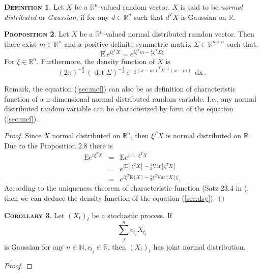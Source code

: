 \documentclass[a4paper, twoside, 11pt]{article}
\theoremstyle{definition}
\newtheorem{definition}{\scshape Definition}[section]
\newtheorem{proposition}[definition]{\scshape Proposition}
\newtheorem{corollary}[definition]{\scshape Corollary}
\newcommand{\sqbr}[1]{\left[ {#1} \right]}
\begin{document}
\begin{definition}
  Let $X$ be a $\mathbb{R}^{n}$-valued random vector. $X$ is said to be \emph{normal distributed} or \emph{Gaussian}, if for any $d \in \mathbb{R}^{n}$ such that $d^TX$ is Gaussian on $\mathbb{R}$.
\end{definition}
\begin{proposition}
  Let $X$ be a $\mathbb{R}^{n}$-valued normal distributed ramdon vector. Then there exist $m \in \mathbb{R}^{n}$ and a positive definite symmetric matrix $\Sigma \in \mathbb{R}^{n\times n}$ such that,
  \begin{equation}
	\mathrm{E}\,e^{i\xi^TX} = e^{i\xi^Tm - \frac{1}{2}\xi^T \Sigma \xi}
	\label{sec:mcf}
  \end{equation}
  For $\xi \in \mathbb{R}^{n}$. Furthermore, the density function of $X$ is
\begin{equation}
  (2\pi)^{-\frac{d}{2}}\, (\det\Sigma) ^{-\frac{1}{2}}\,e^{-\frac{1}{2}(x-m)^T\Sigma^{-1}(x-m)}\,\mathop{dx}.
  \label{sec:dsy}
\end{equation}
\end{proposition}

Remark, the equation (\ref{sec:mcf}) can also be as definition of characteristic function of a n-dimensional normal distributed random variable. I.e., any normal distributed random variable can be characterized by form of the equation (\ref{sec:mcf}).

\begin{proof}
  Since $X$ normal distributed on $\mathbb{R}^{n}$, then $\xi^T X$ is normal distributed on $\mathbb{R}$. Due to the Proposition 2.8 there is
  \begin{eqnarray*}
	\mathrm{E} e^{i\xi^T X} &=& \mathrm{E} e^{i\cdot 1 \cdot \xi^T X}\\
	                        &=& e^{i\mathrm{E}\sqbr{\xi^T X} -\frac{1}{2}\mathrm{Var}\sqbr{\xi^T X}}\\
							&=& e^{i\xi^T\mathrm{E}\sqbr{X} - \frac{1}{2}\xi^T \mathrm{Var}\sqbr{X} \xi}.
  \end{eqnarray*}
  According to the uniqueness theorem of characteristic function (Satz 23.4 in \cite{bauer}), then we can deduce the density function of the equation (\ref{sec:dsy}).
\end{proof}

\begin{corollary}
  Let $(X_t)_t$ be a stochastic process. If 
  \begin{equation}
	\sum_j^n c_{t_j} X_{t_j}
  \end{equation}
  is Gaussian for any $n \in \mathbb{N}, c_{t_j} \in \mathbb{R}$, then $(X_t)_t$ has joint normal distribution.
\end{corollary}
\begin{proof}
  
\end{proof}
\end{document}
